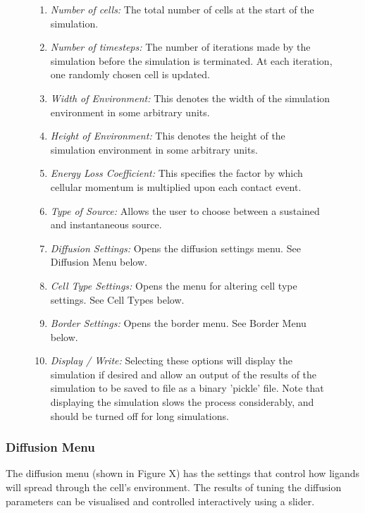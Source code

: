 \documentclass[12pt]{article}
\begin{document}
\begin{figure}[H]
{\begin{enumerate}[topsep=2pt,itemsep=-1ex,partopsep=1ex,parsep=1ex]
\item {\itshape Number of cells:} The total number of cells at the start 
of the simulation.
\item {\itshape Number of timesteps:} The number of iterations made by 
the simulation before the simulation is terminated. At each iteration, 
one randomly chosen cell is updated.
\item {\itshape Width of Environment:} This denotes the width of the 
simulation environment in some arbitrary units.
\item {\itshape Height of Environment:} This denotes the height of the 
simulation environment in some arbitrary units.
\item {\itshape Energy Loss Coefficient:} This specifies the factor by 
which cellular momentum is multiplied upon each contact event.
\item {\itshape Type of Source:} Allows the user to choose between 
a sustained and instantaneous source.
\item {\itshape Diffusion Settings:} Opens the diffusion settings menu. See Diffusion Menu below.
\item {\itshape Cell Type Settings:} Opens the menu for altering cell 
type settings. See Cell Types below.
\item {\itshape Border Settings:} Opens the border menu. See Border Menu below.
\item {\itshape Display / Write:} Selecting these options will display 
the simulation if desired and allow an output of the results of the 
simulation to be saved to file as a binary 'pickle' file. Note that 
displaying the simulation slows the process considerably, and should be 
turned off for long simulations.
\end{enumerate}
}
\end{figure}

\subsubsection{Diffusion Menu}
The diffusion menu (shown in Figure X) has the settings that control how 
ligands will spread through the cell's environment. The results of 
tuning the diffusion parameters can be visualised and controlled 
interactively using a slider.
\end{document}
